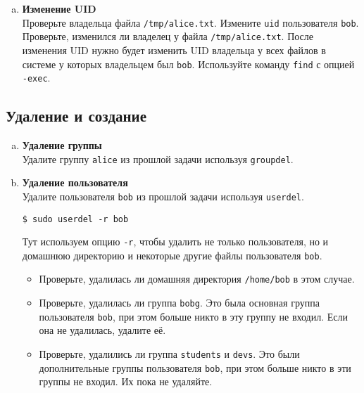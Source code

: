 \documentclass{article}
\begin{document}
\begin{enumerate}[a.]
\item \textbf{Изменение UID}\\
Проверьте владельца файла \texttt{/tmp/alice.txt}. Измените \texttt{uid} пользователя \texttt{bob}. Проверьте, изменился ли владелец у файла \texttt{/tmp/alice.txt}.
После изменения UID нужно будет изменить UID владельца у всех файлов в системе у которых владельцем был \texttt{bob}. Используйте команду \texttt{find} с опцией \texttt{-exec}.




\end{enumerate}

\subsection{Удаление и создание}
\begin{enumerate}[a.]
\item \textbf{Удаление группы}\\
Удалите группу \texttt{alice} из прошлой задачи используя \texttt{groupdel}.

\item \textbf{Удаление пользователя}\\
Удалите пользователя \texttt{bob} из прошлой задачи используя \texttt{userdel}.
\begin{lstlisting}
$ sudo userdel -r bob
\end{lstlisting}
Тут используем опцию \texttt{-r}, чтобы удалить не только пользователя, но и домашнюю директорию и некоторые другие файлы пользователя \texttt{bob}. 
\begin{itemize}
\item Проверьте, удалилась ли домашняя директория \texttt{/home/bob} в этом случае.
\item Проверьте, удалилась ли группа \texttt{bobg}. Это была основная группа пользователя \texttt{bob}, при этом больше никто в эту группу не входил. Если она не удалилась, удалите её.
\item Проверьте, удалились ли группа \texttt{students} и \texttt{devs}. Это были дополнительные группы пользователя \texttt{bob}, при этом больше никто в эти группы не входил. Их пока не удаляйте.
\end{itemize}


\end{enumerate}
\end{document}
